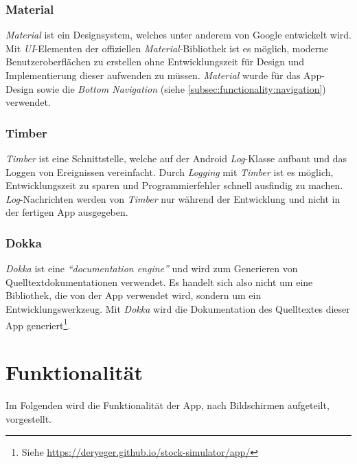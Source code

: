 \documentclass[a4paper]{article}
\begin{document}
\subsubsection{Material}
\label{subsubsec:technologies:bibs:material}
\textit{Material} ist ein Designsystem, welches unter anderem von Google entwickelt wird.
Mit \textit{UI}-Elementen der offiziellen \textit{Material}-Bibliothek ist es möglich, moderne Benutzeroberflächen zu erstellen ohne Entwicklungszeit für Design und Implementierung dieser aufwenden zu müssen.
\textit{Material} wurde für das App-Design sowie die \textit{Bottom Navigation} (siehe \autoref{subsec:functionality:navigation}) verwendet.


\subsubsection{Timber}
\label{subsubsec:technologies:bibs:timber}
\textit{Timber} ist eine Schnittstelle, welche auf der Android \textit{Log}-Klasse aufbaut und das Loggen von Ereignissen vereinfacht.
Durch \textit{Logging} mit \textit{Timber} ist es möglich, Entwicklungszeit zu sparen und Programmierfehler schnell ausfindig zu machen.
\textit{Log}-Nachrichten werden von \textit{Timber} nur während der Entwicklung und nicht in der fertigen App ausgegeben.


\subsubsection{Dokka}
\label{subsubsec:technologies:bibs:dokka}
\textit{Dokka} ist eine \textit{"`documentation engine"'} \autocite{dokka} und wird zum Generieren von Quelltextdokumentationen verwendet.
Es handelt sich also nicht um eine Bibliothek, die von der App verwendet wird, sondern um ein Entwicklungswerkzeug.
Mit \textit{Dokka} wird die Dokumentation des Quelltextes dieser App generiert\footnote{Siehe \url{https://deryeger.github.io/stock-simulator/app/}}.


\section{Funktionalität}
\label{sec:functionality}
Im Folgenden wird die Funktionalität der App, nach Bildschirmen aufgeteilt, vorgestellt.
\end{document}
